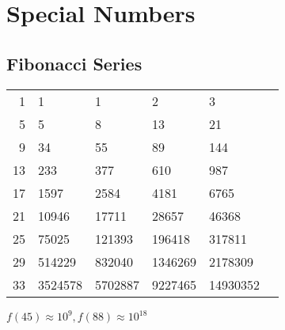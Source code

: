 \documentclass[a4paper,10pt,twocolumn,oneside]{article}
\begin{document}
\section{Special Numbers}

\subsection{Fibonacci Series}

{\normalsize
\begin{center}
    \begin{tabular}{r|lllll}
        1 & 1 & 1 & 2 & 3 \\
        5 & 5 & 8 & 13 & 21 \\
        9 & 34 & 55 & 89 & 144 \\
        13 & 233 & 377 & 610 & 987 \\
        17 & 1597 & 2584 & 4181 & 6765 \\
        21 & 10946 & 17711 & 28657 & 46368 \\
        25 & 75025 & 121393 & 196418 & 317811 \\
        29 & 514229 & 832040 & 1346269 & 2178309 \\
        33 & 3524578 & 5702887 & 9227465 & 14930352
    \end{tabular}
\end{center}
\noindent
$f(45) \approx 10^9, f(88) \approx 10^{18}$
}
\end{document}
